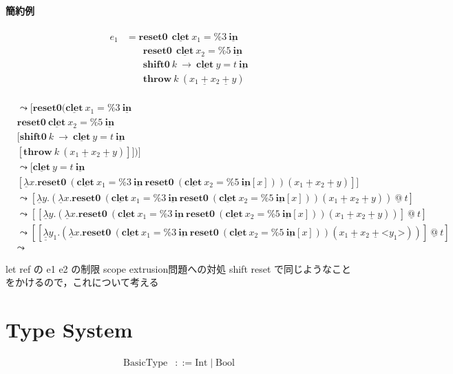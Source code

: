 \documentclass[10pt,a4j]{jarticle}
\makeatletter
\newcommand\Resetz{\textbf{reset0}}
\newcommand\Shiftz{\textbf{shift0}}
\newcommand\Throw{\textbf{throw}}
\newcommand\cfun[2]{\underline{\lambda}{#1}.{#2}}
\newcommand\ccfun[2]{\underline{\underline{\lambda}}{#1}.{#2}}
\newcommand\cPlus{\underline{\textbf{+}}}
\newcommand\cLet{\underline{\textbf{clet}}}
\newcommand\cIn{\underline{\textbf{in}}}
\newcommand\csp[1]{\texttt{\%}{#1}}
\newcommand\code[1]{\texttt{<}{#1}\texttt{>}}
\newcommand\lto{\leadsto}
\newcommand\cat{\underline{@}}
\theoremstyle{break}
\makeatother
\begin{document}
\paragraph{簡約例}

\begin{align*}
  e_1 & = \Resetz ~~\cLet~x_1=\csp{3}~\cIn \\
      & \phantom{=}~~ \Resetz ~~\cLet~x_2=\csp{5}~\cIn \\
      & \phantom{=}~~ \Shiftz~k~\to~\cLet~y=t~\cIn \\
      & \phantom{=}~~ \Throw~ k~ (x_1~\cPlus~x_2~\cPlus~y) \\
\end{align*}

\begin{align*}
  [ e_1 ] &\lto [ \Resetz (\cLet~x_1=\csp{3}~\cIn \\
          &\Resetz~ \cLet~x_2=\csp{5}~\cIn \\
          &[ \Shiftz~ k~ \to~ \cLet~ y=t~ \cIn \\
          &[ \Throw~ k~(x_1~\cPlus~x_2~\cPlus~y) ] ] ) ] \\
          &\lto [ \cLet~ y=t~ \cIn \\
          &[ \cfun{x}{\Resetz~ (\cLet~x_1=\csp{3}~ \cIn~ \Resetz~ (\cLet~ x_2=\csp{5}~ \cIn [x]))} (x_1~\cPlus~x_2~\cPlus~y) ]] \\
          &\lto [ \cfun{y}{(\cfun{x}{\Resetz~ (\cLet~x_1=\csp{3}~ \cIn~ \Resetz~ (\cLet~ x_2=\csp{5}~ \cIn [x]))} (x_1~\cPlus~x_2~\cPlus~y))}~ \cat~ t ] \\
          &\lto [[\cfun{y}{(\cfun{x}{\Resetz~ (\cLet~x_1=\csp{3}~ \cIn~ \Resetz~ (\cLet~ x_2=\csp{5}~ \cIn [x]))} (x_1~\cPlus~x_2~\cPlus~y))}]~ \cat~ t] \\
          &\lto [[\ccfun{y_1}{(\cfun{x}{\Resetz~ (\cLet~x_1=\csp{3}~ \cIn~ \Resetz~ (\cLet~ x_2=\csp{5}~ \cIn [x]))} (x_1~\cPlus~x_2~\cPlus~ \code{y_1}))}]~ \cat~ t] \\
          &\lto
\end{align*}

let ref の e1 e2 の制限 scope extrusion問題への対処
shift reset で同じようなことをかけるので，これについて考える


\section{Type System}

\begin{align*}
  \textrm{BasicType} & ::= \textrm{Int} \mid \textrm{Bool}
\end{align*}
\end{document}
